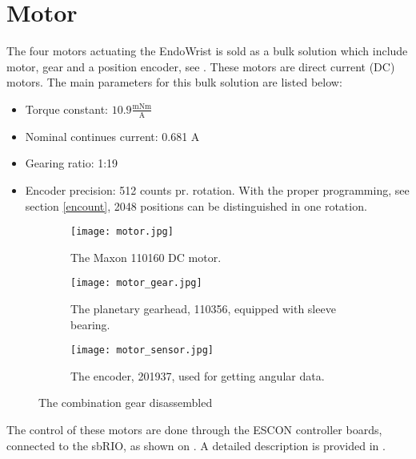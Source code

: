 \section{Motor}\label{Maxon_Motor}
The four motors actuating the EndoWrist is sold as a bulk solution which include motor\cite{motor_motor}, gear\cite{motor_gear} and a position encoder\cite{motor_encoder}, see .
These motors are direct current (DC) motors. The main parameters for this bulk solution are listed below:

\begin{itemize}
	\item Torque constant: $10.9\frac{\text{mNm}}{\text{A}}$
	\item Nominal continues current: 0.681 A 
	\item Gearing ratio: 1:19
	\item Encoder precision: 512 counts pr. rotation. With the proper programming, see section \ref{encount}, 2048 positions can be distinguished in one rotation.
\end{itemize}

\begin{figure}[H]
	\centering
	\begin{subfigure}{.32\textwidth}
		\vspace{0pt}
		\centering
		\texttt{[image: motor.jpg]}
		\caption{The Maxon 110160 \newline DC motor.}
		\label{fig:motor}
	\end{subfigure}
	\begin{subfigure}{.32\textwidth}
		\centering
		\texttt{[image: motor\_gear.jpg]}
		\caption{The planetary gearhead, 110356, equipped with sleeve bearing.}
		\label{fig:motor_gear}
	\end{subfigure}
	\begin{subfigure}{.32\textwidth}
		\hspace{5pt}
		\centering
		\texttt{[image: motor\_sensor.jpg]}
		\caption{The encoder, 201937, used for getting angular data.}
		\label{fig:motor_sensor}
	\end{subfigure}
	\caption{The combination gear disassembled}
	\label{fig:Full_motor _dis}
\end{figure}

The control of these motors are done through the ESCON controller boards, connected to the sbRIO, as shown on . A detailed description is provided in .